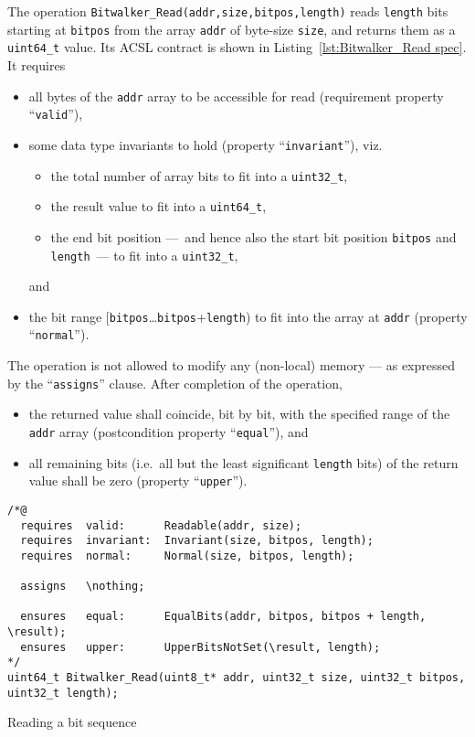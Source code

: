 The operation \lstinline{Bitwalker_Read(addr,size,bitpos,length)} reads
\lstinline{length} bits starting at \lstinline{bitpos} from the array
\lstinline{addr} of byte-size \lstinline{size}, and returns them as a
\lstinline{uint64_t} value.
%
Its ACSL contract is shown in Listing~\ref{lst:Bitwalker_Read spec}.
%
It requires
%
\begin{itemize}
\item all bytes of the \lstinline{addr} array to be accessible for read
	(requirement property ``\lstinline{valid}''),
\item some data type invariants to hold
	(property ``\lstinline{invariant}''), viz.\
	\begin{itemize}
	\item the total number of array bits to fit into a
		\lstinline{uint32_t},
	\item the result value to fit into a \lstinline{uint64_t},
	\item the end bit position ---~and hence also the start bit position
		\lstinline{bitpos} and \lstinline{length}~---
		to fit into a \lstinline{uint32_t}, 
	\end{itemize}
	and
\item the bit range
	[\lstinline{bitpos}\ldots\lstinline{bitpos}+\lstinline{length})
	to fit into the array at \lstinline{addr}
	(property ``\lstinline{normal}'').
\end{itemize}
%
The operation is not allowed to modify any (non-local) memory
--- as expressed by the ``\lstinline{assigns}'' clause.
%
After completion of the operation,
%
\begin{itemize}
\item the returned value shall coincide, bit by bit, with the specified
	range of the \lstinline{addr} array 
	(postcondition property ``\lstinline{equal}''), and
\item all remaining bits (i.e.\ all but the least significant 
	\lstinline{length} bits) of the return value shall be zero 
	(property ``\lstinline{upper}'').
\end{itemize}







\begin{listing}[hbt]
\begin{minipage}{0.99\textwidth}
\begin{lstlisting}[style=acsl-block]
/*@
  requires  valid:      Readable(addr, size);
  requires  invariant:  Invariant(size, bitpos, length);
  requires  normal:     Normal(size, bitpos, length);

  assigns   \nothing;

  ensures   equal:      EqualBits(addr, bitpos, bitpos + length, \result);
  ensures   upper:      UpperBitsNotSet(\result, length);
*/
uint64_t Bitwalker_Read(uint8_t* addr, uint32_t size, uint32_t bitpos, uint32_t length);
\end{lstlisting}
\end{minipage}
\caption{\label{lst:Bitwalker_Read spec}Reading a bit sequence}
\end{listing}





